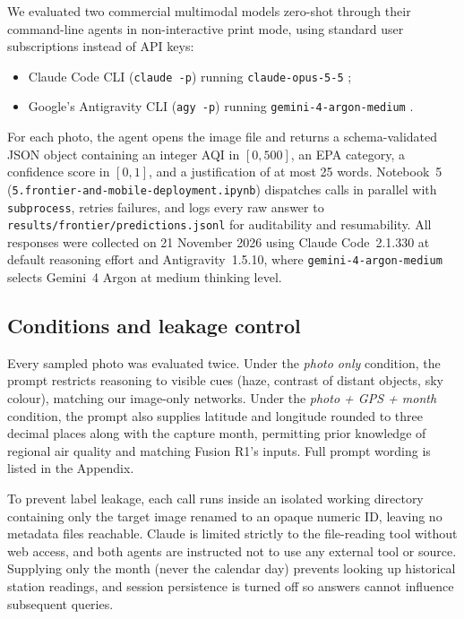 \documentclass[conference]{IEEEtran}
\begin{document}
We evaluated two commercial multimodal models zero-shot through their
command-line agents in non-interactive print mode, using standard user
subscriptions instead of API keys:
\begin{itemize}
  \item Claude Code CLI (\texttt{claude -p}) running \texttt{claude-opus-5-5}
        \cite{anthropic2026claude};
  \item Google's Antigravity CLI (\texttt{agy -p}) running
        \texttt{gemini-4-argon-medium} \cite{google2026gemini}.
\end{itemize}
For each photo, the agent opens the image file and returns a schema-validated
JSON object containing an integer AQI in $[0,500]$, an EPA category, a
confidence score in $[0,1]$, and a justification of at most 25 words. Notebook~5
(\texttt{5.frontier-and-mobile-deployment.ipynb}) dispatches calls in parallel
with \texttt{subprocess}, retries failures, and logs every raw answer to
\texttt{results/frontier/predictions.jsonl} for auditability and resumability.
All responses were collected on 21 November 2026 using Claude Code~2.1.330 at
default reasoning effort and Antigravity~1.5.10, where
\texttt{gemini-4-argon-medium} selects Gemini~4 Argon at medium thinking level.

\subsection{Conditions and leakage control}

Every sampled photo was evaluated twice. Under the \emph{photo only} condition,
the prompt restricts reasoning to visible cues (haze, contrast of distant
objects, sky colour), matching our image-only networks. Under the \emph{photo +
GPS + month} condition, the prompt also supplies latitude and longitude rounded
to three decimal places along with the capture month, permitting prior knowledge
of regional air quality and matching Fusion R1's inputs. Full prompt wording is
listed in the Appendix.

To prevent label leakage, each call runs inside an isolated working directory
containing only the target image renamed to an opaque numeric ID, leaving no
metadata files reachable. Claude is limited strictly to the file-reading tool
without web access, and both agents are instructed not to use any external tool
or source. Supplying only the month (never the calendar day) prevents looking up
historical station readings, and session persistence is turned off so answers
cannot influence subsequent queries.
\end{document}
